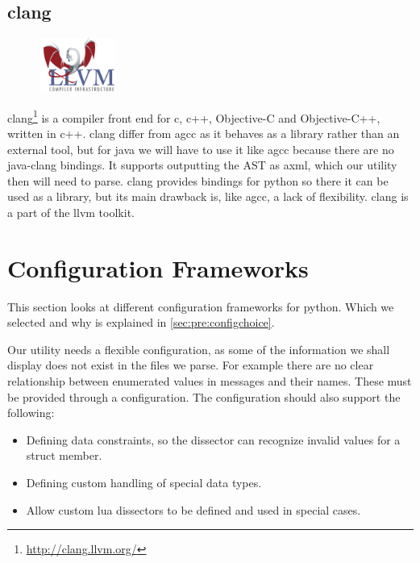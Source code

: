 \subsection{\Gls{clang}}
\label{sec:pre:clang}
\begin{figure}
	\vspace{-20pt}
	\includegraphics[width=2.5cm]{./planning/img/llvm_logo}
	\vspace{-20pt}
\end{figure}
\Gls{clang}\footnote{\url{http://clang.llvm.org/}} is a compiler front end for \Gls{c}, 
\Gls{c++}, \Gls{Objective-C} and \Gls{Objective-C++}, written in \Gls{c++}. \Gls{clang} differ from \Gls{agcc} as it
behaves as a \gls{library} rather than an external tool, but for \Gls{java} we will have to
use it like \Gls{agcc} because there are no \Gls{java}-\Gls{clang} bindings. It supports
outputting the \gls{AST} as \Gls{axml}, which our \gls{utility} then will need to
parse. \Gls{clang} provides bindings for \Gls{python} so there it can be used as a \gls{library},
but its main drawback is, like \Gls{agcc}, a lack of flexibility. \Gls{clang} is a part of
the \Gls{llvm} toolkit.


\section{Configuration Frameworks}
\label{sec:pre:config}
This section looks at different configuration frameworks for \Gls{python}. Which we
selected and why is explained in \autoref{sec:pre:configchoice}.

Our \gls{utility} needs a flexible configuration, as some of the information we
shall display does not exist in the files we parse. For example there are no
clear relationship between enumerated values in messages and their names.
These must be provided through a configuration. The configuration should also
support the following:
\begin{itemize}
	\item Defining data constraints, so the \gls{dissector} can recognize invalid
		values for a \gls{struct} member.
	\item Defining custom handling of special data types.
	\item Allow custom \Gls{lua} \glspl{dissector} to be defined and used in special cases.
\end{itemize}

